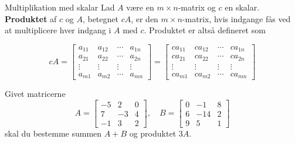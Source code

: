 \begin{definition}{Multiplikation med skalar}
    Lad $A$ være en $m \times n$-matrix og $c$ en skalar. \textbf{Produktet} af $c$ og $A$, betegnet $cA$, er den $m \times n$-matrix, hvis indgange fås ved at multiplicere hver indgang i $A$ med $c$. Produktet er altså defineret som

    $$
    c A=\left[\begin{array}{cccc}
    a_{11} & a_{12} & \cdots & a_{1 n} \\
    a_{21} & a_{22} & \cdots & a_{2 n} \\
    \vdots & \vdots & \vdots & \vdots \\
    a_{m 1} & a_{m 2} & \cdots & a_{m n}
    \end{array}\right] = \left[\begin{array}{cccc}
    c a_{11} & c a_{12} & \cdots & c a_{1 n} \\
    c a_{21} & c a_{22} & \cdots & c a_{2 n} \\
    \vdots & \vdots & \vdots & \vdots \\
    c a_{m 1} & c a_{m 2} & \cdots & c a_{m n}
    \end{array}\right]
    $$
    
\end{definition}

 \begin{example}
    Givet matricerne
    \[
A=\left[\begin{array}{ccc}
-5 & 2 & 0 \\
7 & -3 & 4 \\
-1 & 3 & 2
\end{array}\right] , \quad
B=\left[\begin{array}{ccc}
0 & -1 & 8 \\
6 & -14 & 2 \\
9 & 5 & 1
\end{array}\right]
\]
    skal du bestemme summen $A + B$ og produktet $3A$.
 \end{example}

